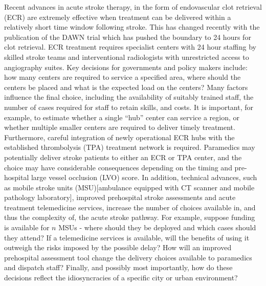 \documentclass[utf8]{frontiersHLTH}
\begin{document}
Recent advances in acute stroke therapy, in the form of endovascular
clot retrieval
(ECR)\cite{berkhemer2015randomized,goyal2016endovascular,goyal2015randomized,campbell2015endovascular,saver2015stent}
are extremely effective when treatment can be delivered within a
relatively short time window following stroke. This has changed
recently with the publication of the DAWN trial which has pushed the
boundary to 24 hours for clot
retrieval\cite{nogueira2018thrombectomy}. ECR treatment requires
specialist centers with 24 hour staffing by skilled stroke teams and
interventional radiologists with unrestricted access to angiography
suites. Key decisions for governments and policy makers include: how
many centers are required to service a specified area, where should
the centers be placed and what is the expected load on the centers?
Many factors influence the final choice, including the availability of
suitably trained staff, the number of cases required for staff to
retain skills, and costs. It is important, for example, to estimate
whether a single ``hub'' center can service a region, or whether
multiple smaller centers are required to deliver timely
treatment. Furthermore, careful integration of newly operational ECR
hubs with the established thrombolysis (TPA)\cite{tnionda1995tissue}
treatment network is required. Paramedics may potentially deliver
stroke patients to either an ECR or TPA center, and the choice may
have considerable consequences depending on the timing and
pre-hospital large vessel occlusion (LVO) score. In addition,
technical advances, such as mobile stroke units (MSU)[ambulance
equipped with CT scanner and mobile pathology laboratory], improved
prehospital stroke assessments and acute treatment telemedicine
services, increase the number of choices available in, and thus the
complexity of, the acute stroke pathway. For example, suppose funding
is available for $n$ MSUs - where should they be deployed and which
cases should they attend? If a telemedicine services is available,
will the benefits of using it outweigh the risks imposed by the
possible delay?  How will an improved prehospital assessment tool
change the delivery choices available to paramedics and dispatch
staff? Finally, and possibly most importantly, how do these decisions
reflect the idiosyncracies of a specific city or urban environment?
\end{document}
